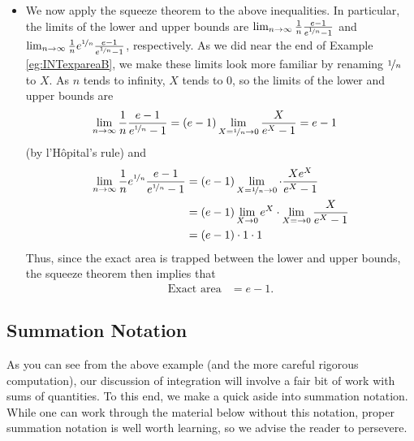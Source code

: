 \begin{itemize}
\item We now apply the squeeze theorem to the above inequalities. 
In particular, the limits of the lower and upper bounds are
$\lim_{n\rightarrow\infty}\frac{1}{n}\frac{e-1}{e^{\nicefrac{1}{n}}-1}$ and
$\lim_{n\rightarrow\infty}\frac{1}{n}e^{\nicefrac{1}{n}}\frac{e-1}{e^{\nicefrac{1}{n}}-1}$, respectively. As we did near the end of 
Example \ref{eg:INTexpareaB}, we make these limits look more familiar 
by renaming $\nicefrac{1}{n}$ to $X$. As $n$ tends to infinity, 
$X$ tends to $0$, so the limits of the lower and upper bounds are
\begin{align*}
\lim_{n\rightarrow\infty}\frac{1}{n}\frac{e-1}{e^{\nicefrac{1}{n}}-1}
&=(e-1)\lim_{X=\nicefrac{1}{n}\rightarrow 0}\frac{X}{e^X-1}
=e-1
\end{align*}
(by l'H\^opital's rule) and 
\begin{align*}
\lim_{n\rightarrow\infty}\frac{1}{n}e^{\nicefrac{1}{n}}\frac{e-1}{e^{\nicefrac{1}{n}}-1}
&=(e-1)\lim_{X=\nicefrac{1}{n}\rightarrow 0}\cdot \frac{Xe^X}{e^X-1}\\
&=(e-1)\lim_{X\to 0}e^X \cdot \lim_{X=\to 0}\frac{X}{e^X-1}\\
&=(e-1) \cdot 1 \cdot 1
\end{align*}
Thus, since the exact area is trapped between the lower and upper bounds, the squeeze
theorem then implies that
\begin{align*}
 \text{Exact area} &= e-1.
\end{align*}

\end{itemize}


\subsection{Summation Notation}\label{ssec sum notn}
As you can see from the above example (and the more careful rigorous computation), our
discussion of integration will involve a fair bit of work with sums of quantities. To
this end, we make a quick aside into summation notation. While one can work through the
material below without this notation, proper summation notation is well worth learning,
so we advise the reader to persevere.



